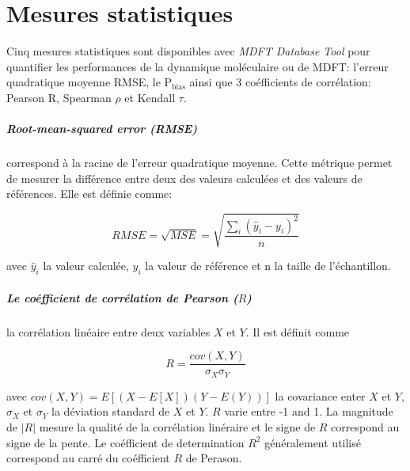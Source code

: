 %




\chapter{Mesures statistiques}
\label{chap:annexes:stats}

Cinq mesures statistiques sont disponibles avec \textit{MDFT Database Tool} pour quantifier les performances de la dynamique moléculaire ou de MDFT: l'erreur quadratique moyenne RMSE, le $\mathrm{P}_{\mathrm{bias}}$ ainsi que 3 coéfficients de corrélation: Pearson R, Spearman $\rho$ et Kendall $\tau$.

\paragraph{Root-mean-squared error (RMSE)} correspond à la racine de l'erreur quadratique moyenne. Cette métrique permet de mesurer la différence entre deux des valeurs calculées et des valeurs de références. Elle est définie comme:

\begin{equation}
    RMSE = \sqrt{MSE} = \sqrt{\frac{\sum_i{(\hat{y}_i-y_i)^2}}{n}}
\end{equation}

\noindent avec $\hat{y}_i$ la valeur calculée, $y_i$ la valeur de référence et n la taille de l'échantillon.

\paragraph{Le coéfficient de corrélation de Pearson ($R$)} la corrélation linéaire entre deux variables $X$ et $Y$. Il est définit comme

\begin{equation}
    R = \frac{cov(X,Y)}{\sigma_X \sigma_Y}
\end{equation}

\noindent avec $cov(X,Y)=E[(X-E[X])(Y-E(Y))]$ la covariance enter $X$ et $Y$, $\sigma_X$ et $\sigma_Y$ la déviation standard de $X$ et $Y$. $R$ varie entre -1 and 1. La magnitude de $|R|$ mesure la qualité de la corrélation linéraire et le signe de $R$ correspond au signe de la pente. Le coéfficient de determination $R^2$ généralement utilisé correspond au carré du coéfficient $R$ de Perason.

